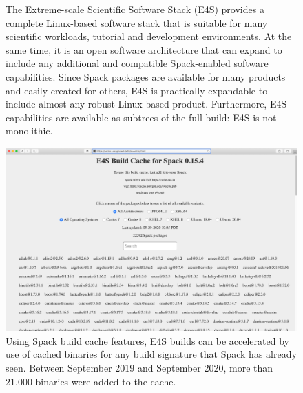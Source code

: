 \begin{figure}
	\centering
	\caption{The Extreme-scale Scientific Software Stack (E4S) provides a complete Linux-based software stack that is suitable for many scientific workloads, tutorial and development environments.  At the same time, it is an open software architecture that can expand to include any additional and compatible Spack-enabled software capabilities. Since Spack packages are available for many products and easily created for others, E4S is practically expandable to include almost any robust Linux-based product.  Furthermore, E4S capabilities are available as subtrees of the full build: E4S is not monolithic.}
	\label{fig:e4s-is-isnot}
\end{figure}

\begin{figure}
	\centering
	\includegraphics[width=0.9\linewidth]{E4S-Build-Cache-Binaries-2020}
	\caption{Using Spack build cache features, E4S builds can be accelerated by use of cached binaries for any build signature that Spack has already seen. Between September 2019 and September 2020, more than 21,000 binaries were added to the cache.}
	\label{fig:e4s-build-cache}
\end{figure}

